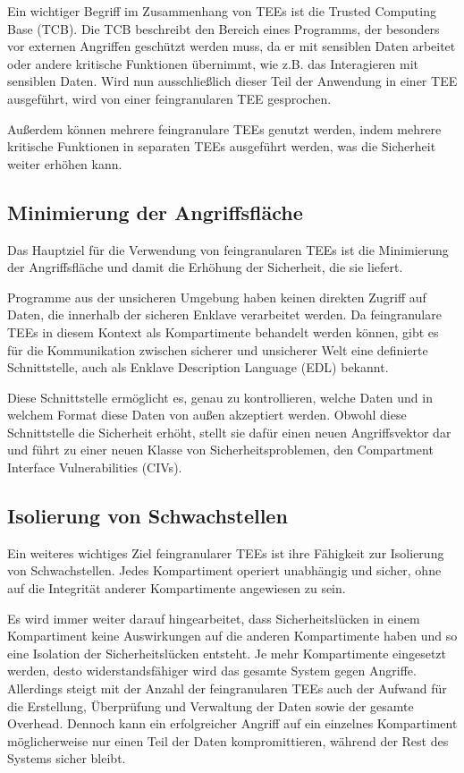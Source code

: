 Ein wichtiger Begriff im Zusammenhang von TEEs ist die Trusted Computing Base (TCB). Die TCB beschreibt den Bereich eines Programms, der besonders vor externen Angriffen geschützt werden muss, da er mit sensiblen Daten arbeitet oder andere kritische Funktionen übernimmt, wie z.B. das Interagieren mit sensiblen Daten. Wird nun ausschließlich dieser Teil der Anwendung in einer TEE ausgeführt, wird von einer feingranularen TEE gesprochen.

Außerdem können mehrere feingranulare TEEs genutzt werden, indem mehrere kritische Funktionen in separaten TEEs ausgeführt werden, was die Sicherheit weiter erhöhen kann.

\subsection{Minimierung der Angriffsfläche}
Das Hauptziel für die Verwendung von feingranularen TEEs ist die Minimierung der Angriffsfläche und damit die Erhöhung der Sicherheit, die sie liefert. 

Programme aus der unsicheren Umgebung haben keinen direkten Zugriff auf Daten, die innerhalb der sicheren Enklave verarbeitet werden. Da feingranulare TEEs in diesem Kontext als Kompartimente behandelt werden können, gibt es für die Kommunikation zwischen sicherer und unsicherer Welt eine definierte Schnittstelle, auch als Enklave Description Language (EDL) bekannt. 

Diese Schnittstelle ermöglicht es, genau zu kontrollieren, welche Daten und in welchem Format diese Daten von außen akzeptiert werden. Obwohl diese Schnittstelle die Sicherheit erhöht, stellt sie dafür einen neuen Angriffsvektor dar und führt zu einer neuen Klasse von Sicherheitsproblemen, den Compartment Interface Vulnerabilities (CIVs)\cite{CIVPaper}.

\subsection{Isolierung von Schwachstellen}
Ein weiteres wichtiges Ziel feingranularer TEEs ist ihre Fähigkeit zur Isolierung von Schwachstellen. Jedes Kompartiment operiert unabhängig und sicher, ohne auf die Integrität anderer Kompartimente angewiesen zu sein. 

Es wird immer weiter darauf hingearbeitet, dass Sicherheitslücken in einem Kompartiment keine Auswirkungen auf die anderen Kompartimente haben und so eine Isolation der Sicherheitslücken entsteht. Je mehr Kompartimente eingesetzt werden, desto widerstandsfähiger wird das gesamte System gegen Angriffe. Allerdings steigt mit der Anzahl der feingranularen TEEs auch der Aufwand für die Erstellung, Überprüfung und Verwaltung der Daten sowie der gesamte Overhead. Dennoch kann ein erfolgreicher Angriff auf ein einzelnes Kompartiment möglicherweise nur einen Teil der Daten kompromittieren, während der Rest des Systems sicher bleibt.

